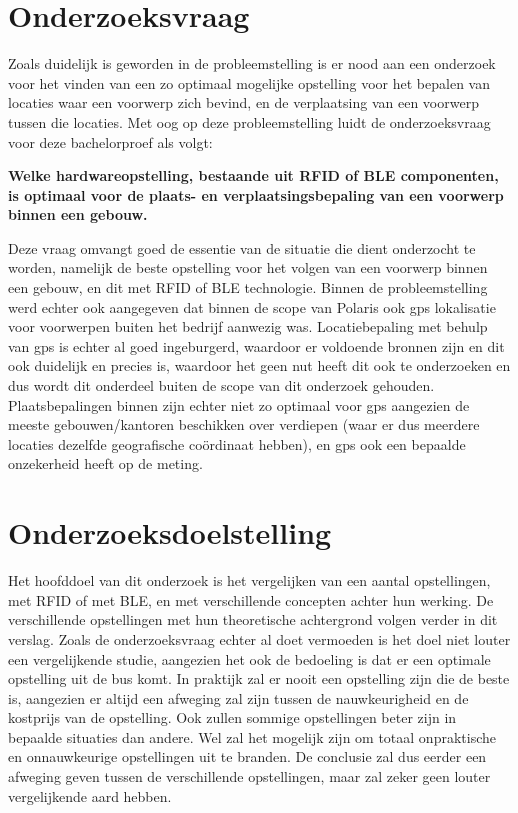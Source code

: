 \section{Onderzoeksvraag}
\label{sec:onderzoeksvraag}

Zoals duidelijk is geworden in de probleemstelling is er nood aan een onderzoek voor het vinden van een zo optimaal mogelijke opstelling voor het bepalen van locaties waar een voorwerp zich bevind, en de verplaatsing van een voorwerp tussen die locaties. Met oog op deze probleemstelling luidt de onderzoeksvraag voor deze bachelorproef als volgt:
\begin{center}
	\textbf{Welke hardwareopstelling, bestaande uit RFID of BLE componenten, is optimaal voor de plaats- en verplaatsingsbepaling van een voorwerp binnen een gebouw.}
\end{center}
Deze vraag omvangt goed de essentie van de situatie die dient onderzocht te worden, namelijk de beste opstelling voor het volgen van een voorwerp binnen een gebouw, en dit met RFID of BLE technologie. Binnen de probleemstelling werd echter ook aangegeven dat binnen de scope van Polaris ook gps lokalisatie voor voorwerpen buiten het bedrijf aanwezig was. Locatiebepaling met behulp van gps is echter al goed ingeburgerd, waardoor er voldoende bronnen zijn en dit ook duidelijk en precies is, waardoor het geen nut heeft dit ook te onderzoeken en dus wordt dit onderdeel buiten de scope van dit onderzoek gehouden. Plaatsbepalingen binnen zijn echter niet zo optimaal voor gps aangezien de meeste gebouwen/kantoren beschikken over verdiepen (waar er dus meerdere locaties dezelfde geografische coördinaat hebben), en gps ook een bepaalde onzekerheid heeft op de meting.

\section{Onderzoeksdoelstelling}
\label{sec:onderzoeksdoelstelling}

Het hoofddoel van dit onderzoek is het vergelijken van een aantal opstellingen, met RFID of met BLE, en met verschillende concepten achter hun werking. De verschillende opstellingen met hun theoretische achtergrond volgen verder in dit verslag. Zoals de onderzoeksvraag echter al doet vermoeden is het doel niet louter een vergelijkende studie, aangezien het ook de bedoeling is dat er een optimale opstelling uit de bus komt. 
In praktijk zal er nooit een opstelling zijn die de beste is, aangezien er altijd een afweging zal zijn tussen de nauwkeurigheid en de kostprijs van de opstelling. Ook zullen sommige opstellingen beter zijn in bepaalde situaties dan andere. Wel zal het mogelijk zijn om totaal onpraktische en onnauwkeurige opstellingen uit te branden. De conclusie zal dus eerder een afweging geven tussen de verschillende opstellingen, maar zal zeker geen louter vergelijkende aard hebben.

